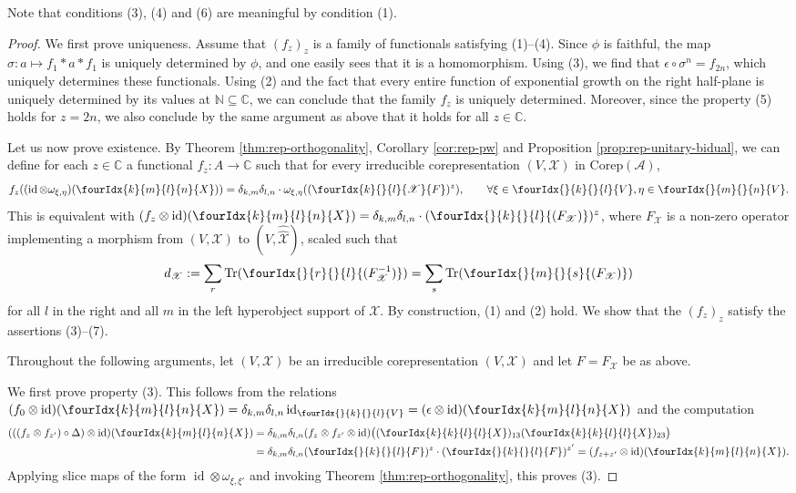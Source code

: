\documentclass[10pt]{article}
\DeclareMathOperator{\id}{id}
\newcommand{\dualco}[1]{\hat{#1}}
\newcommand{\Corep}{\mathrm{Corep}}
\newcommand{\C}{\mathbb{C}}
\newcommand{\N}{\mathbb{N}}
\newcommand{\Tr}{\mathrm{Tr}}
\newcommand{\Gr}[5]{\fourIdx{#2}{#4}{#3}{#5}{#1}}%
\newcommand{\Gru}[3]{\Gr{#1}{}{}{#2}{#3}}
\theoremstyle{definition}
\numberwithin{equation}{section}
\begin{document}
Note that conditions (3), (4) and (6) are meaningful by condition (1).

\begin{proof}
  We first prove uniqueness.  Assume that $(f_{z})_{z}$ is a family of
  functionals satisfying (1)--(4).  Since $\phi$ is faithful, the map
  $\sigma\colon a \mapsto f_{1} \ast a \ast f_{1}$ is uniquely
  determined by $\phi$, and one easily sees that it is a homomorphism. Using
  (3), we find that $\epsilon \circ \sigma^n=f_{2n}$, which uniquely determines these functionals. Using (2) and the
  fact that every entire function of exponential growth on the right
  half-plane is uniquely determined by its values at $\N \subseteq \C$, we can conclude that the family $f_{z}$ is uniquely determined. Moreover, since the property (5) holds for $z = 2n$, we also conclude by the same argument as above that it holds for all $z\in \C$.

  Let us now prove existence.  By Theorem \ref{thm:rep-orthogonality}, Corollary \ref{cor:rep-pw} and Proposition \ref{prop:rep-unitary-bidual}, we can
  define for each $z\in \C$ a functional $f_{z} \colon A \to \C$ such
  that for every 
  irreducible  corepresentation
  $(V,\mathscr{X})$ in $\Corep(\mathscr{A})$, \[ f_{z}((\id \otimes \omega_{\xi,\eta})(\Gr{X}{k}{l}{m}{n})) =
      \delta_{k,m}\delta_{l,n} \cdot
      \omega_{\xi,\eta}((\Gr{F}{k}{l}{}{\mathscr{X}})^{z}), \qquad \forall \xi \in \Gru{V}{k}{l},\eta \in
      \Gru{V}{m}{n}.\] This is equivalent with $(f_{z} \otimes \id)(\Gr{X}{k}{l}{m}{n}) =
      \delta_{k,m}\delta_{l,n} \cdot (\Gru{(F_{\mathscr{X}})}{k}{l})^{z}$, 
    where $F_{\mathscr{X}}$ is a non-zero operator implementing a morphism from $(V,\mathscr{X})$ to
    $(V, \dualco{\dualco{\mathscr{X}}})$, scaled such that
    \[d_{\mathscr{X}}:= \sum_{r} \Tr(\Gru{(F_{\mathscr{X}}^{-1})}{r}{l}) = \sum_{s}
      \Tr(\Gru{(F_{\mathscr{X}})}{m}{s})\]
    for all $l$ in the right and all $m$ in the left hyperobject support of $\mathscr{X}$. By
    construction, (1) and (2) hold. We show that the $(f_{z})_{z}$ satisfy the
    assertions (3)--(7). 

        Throughout the following arguments, let 
    $(V,\mathscr{X})$ be an  irreducible corepresentation
    $(V,\mathscr{X})$ and let $F=F_{\mathscr{X}}$ be as above.

    We first prove property (3). This follows from the relations $(f_{0}  \otimes \id)(\Gr{X}{k}{l}{m}{n}) =
      \delta_{k,m}\delta_{l,n} \id_{\Gru{V}{k}{l}} =
      (\epsilon \otimes \id)(\Gr{X}{k}{l}{m}{n})$ and the computation
    \begin{align*}
      (((f_{z}\otimes f_{z'})\circ \Delta) \otimes
      \id)(\Gr{X}{k}{l}{m}{n}) &=  \delta_{k,m}\delta_{l,n}(f_{z} \otimes f_{z'} \otimes
      \id)\big((\Gr{X}{k}{l}{k}{l})_{13}
      (\Gr{X}{k}{l}{k}{l})_{23}\big) \\
      &=  \delta_{k,m}\delta_{l,n}(\Gru{F}{k}{l})^{z}  \cdot (\Gru{F}{k}{l})^{z'} = (f_{z+z'} \otimes \id)(\Gr{X}{k}{l}{m}{n}).
    \end{align*}
    Applying slice maps of the form $\id
    \otimes \omega_{\xi,\xi'}$ and invoking Theorem \ref{thm:rep-orthogonality}, this proves (3).


\end{proof}
\end{document}
